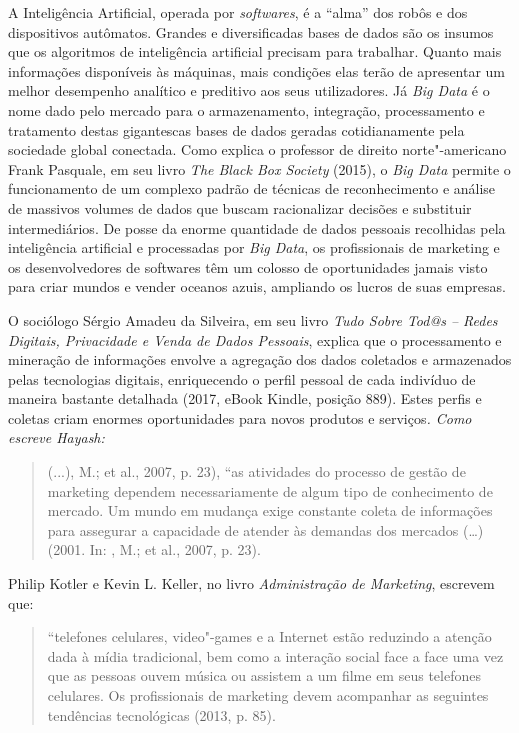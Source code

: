 A Inteligência Artificial, operada por \emph{softwares}, é a ``alma''
dos robôs e dos dispositivos autômatos. Grandes e diversificadas bases
de dados são os insumos que os algoritmos de inteligência artificial
precisam para trabalhar. Quanto mais informações disponíveis às
máquinas, mais condições elas terão de apresentar um melhor desempenho
analítico e preditivo aos seus utilizadores. Já \emph{Big Data} é o nome
dado pelo mercado para o armazenamento, integração, processamento e
tratamento destas gigantescas bases de dados geradas cotidianamente pela
sociedade global conectada. Como explica o professor de direito
norte"-americano Frank Pasquale, em seu livro \emph{The Black Box
Society} (2015), o \emph{Big Data} permite o funcionamento de um
complexo padrão de técnicas de reconhecimento e análise de massivos
volumes de dados que buscam racionalizar decisões e substituir
intermediários. De posse da enorme quantidade de dados pessoais
recolhidas pela inteligência artificial e processadas por \emph{Big
Data}, os profissionais de marketing e os desenvolvedores de softwares
têm um colosso de oportunidades jamais visto para criar mundos e vender
oceanos azuis, ampliando os lucros de suas empresas.

O sociólogo Sérgio Amadeu da Silveira, em seu livro \emph{Tudo Sobre Tod@s -- Redes Digitais, Privacidade e Venda
de Dados Pessoais}, explica que o processamento e mineração de
informações envolve a agregação dos dados coletados e armazenados pelas
tecnologias digitais, enriquecendo o perfil pessoal de cada indivíduo de
maneira bastante detalhada (2017, eBook Kindle, posição 889). Estes
perfis e coletas criam enormes oportunidades para novos produtos e
serviços\emph{. Como escreve Hayash:}

\begin{quote}
(...), M.; et al., 2007, p. 23), ``as atividades do processo de
gestão de marketing dependem necessariamente de algum tipo de
conhecimento de mercado. Um mundo em mudança exige constante coleta de
informações para assegurar a capacidade de atender às demandas dos
mercados (\ldots{}) (2001. In: , M.; et al., 2007, p. 23).
\end{quote}

Philip Kotler e Kevin L. Keller, no livro \emph{Administração de
Marketing}, escrevem que:

\begin{quote}
``telefones celulares, video"-games e a Internet estão reduzindo a
atenção dada à mídia tradicional, bem como a interação social face a
face uma vez que as pessoas ouvem música ou assistem a um filme em seus
telefones celulares. Os profissionais de marketing devem acompanhar as
seguintes tendências tecnológicas (2013, p. 85).
\end{quote}


